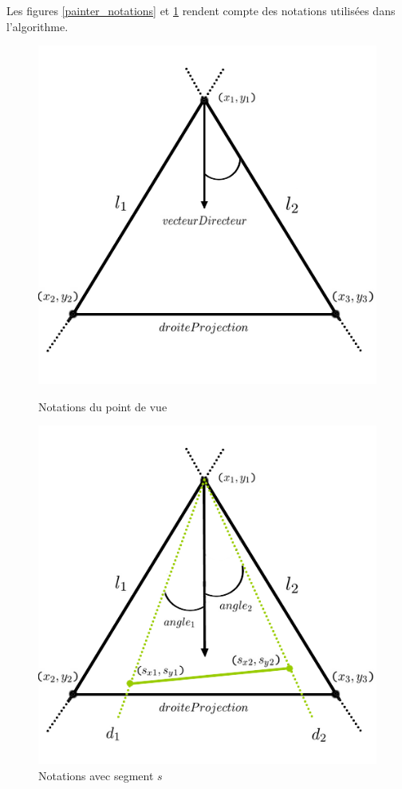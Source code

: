 \documentclass[11pt,a4paper]{article}
\theoremstyle{definition}
\theoremstyle{remark}
\begin{document}
Les figures \ref{painter_notations} et \ref{painter_notations_2} rendent compte des notations utilisées dans l'algorithme.
\\
\begin{figure}[!htbp]
  \centering
  \begin{minipage}[b]{0.4\textwidth}
    \includegraphics[width=\textwidth]{painter_notations.png}
    \caption{Notations du point de vue}
		\label{painter_notations}
  \end{minipage}
  \hfill
  \begin{minipage}[b]{0.4\textwidth}
    \includegraphics[width=\textwidth]{painter_notations_2.png}
    \caption{Notations avec segment $s$}
		\label{painter_notations_2}
  \end{minipage}
\end{figure}
\\
\end{document}
